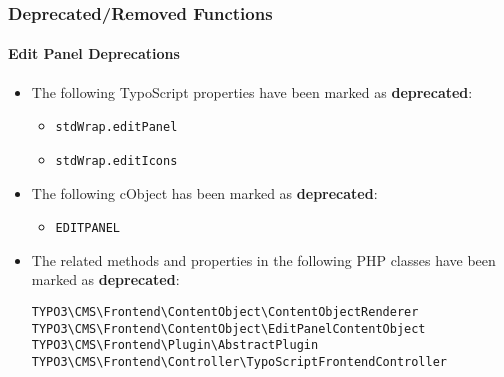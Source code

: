 %

\begin{frame}[fragile]
	\frametitle{Deprecated/Removed Functions}
	\framesubtitle{Edit Panel Deprecations}


	\begin{itemize}
		\item The following TypoScript properties have been marked as \textbf{deprecated}:
			\begin{itemize}\small
				\item \texttt{stdWrap.editPanel}
				\item \texttt{stdWrap.editIcons}
			\end{itemize}\normalsize
		\item The following cObject has been marked as \textbf{deprecated}:
			\begin{itemize}\small
				\item \texttt{EDITPANEL}
			\end{itemize}\normalsize
		\item The related methods and properties in the following PHP classes
			have been marked as \textbf{deprecated}:
\begin{lstlisting}
TYPO3\CMS\Frontend\ContentObject\ContentObjectRenderer
TYPO3\CMS\Frontend\ContentObject\EditPanelContentObject
TYPO3\CMS\Frontend\Plugin\AbstractPlugin
TYPO3\CMS\Frontend\Controller\TypoScriptFrontendController
\end{lstlisting}
	\end{itemize}

\end{frame}

